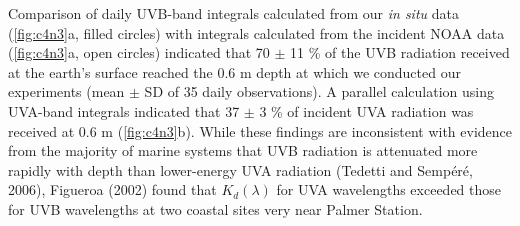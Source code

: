 Comparison of daily UVB-band integrals calculated from our \emph{in situ} data (\autoref{fig:c4n3}a, filled circles) with integrals calculated from the incident NOAA data (\autoref{fig:c4n3}a, open circles) indicated that 70 $\pm$ 11 \% of the UVB radiation received at the earth's surface reached the 0.6 m depth at which we conducted our experiments (mean $\pm$ SD of 35 daily observations). A parallel calculation using UVA-band integrals indicated that 37 $\pm$ 3 \% of incident UVA radiation was received at 0.6 m (\autoref{fig:c4n3}b). While these findings are inconsistent with evidence from the majority of marine systems that UVB radiation is attenuated more rapidly with depth than lower-energy UVA radiation (Tedetti and Semp\'{e}r\'{e}, 2006), Figueroa (2002) found that ${K_d}(\lambda )$ for UVA wavelengths exceeded those for UVB wavelengths at two coastal sites very near Palmer Station.

